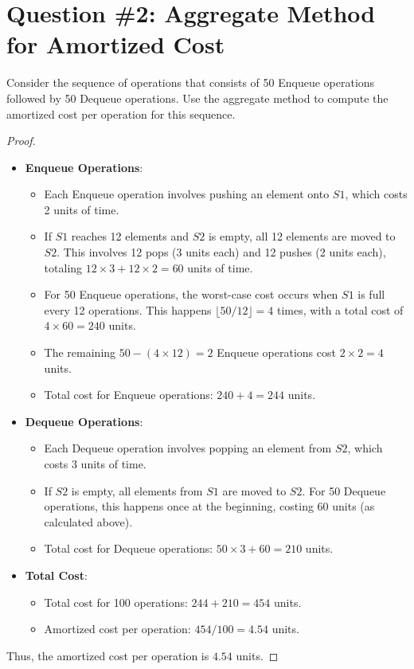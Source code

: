 \documentclass[12pt]{article}
\begin{document}
\section*{Question \#2: Aggregate Method for Amortized Cost}
Consider the sequence of operations that consists of 50 Enqueue operations followed by 50 Dequeue operations. Use the aggregate method to compute the amortized cost per operation for this sequence.

\begin{proof}
\leavevmode\\
\begin{itemize}
    \item \textbf{Enqueue Operations}:
    \begin{itemize}
        \item Each Enqueue operation involves pushing an element onto \( S1 \), which costs 2 units of time.
        \item If \( S1 \) reaches 12 elements and \( S2 \) is empty, all 12 elements are moved to \( S2 \). This involves 12 pops (3 units each) and 12 pushes (2 units each), totaling \( 12 \times 3 + 12 \times 2 = 60 \) units of time.
        \item For 50 Enqueue operations, the worst-case cost occurs when \( S1 \) is full every 12 operations. This happens \( \lfloor 50 / 12 \rfloor = 4 \) times, with a total cost of \( 4 \times 60 = 240 \) units.
        \item The remaining \( 50 - (4 \times 12) = 2 \) Enqueue operations cost \( 2 \times 2 = 4 \) units.
        \item Total cost for Enqueue operations: \( 240 + 4 = 244 \) units.
    \end{itemize}

    \item \textbf{Dequeue Operations}:
    \begin{itemize}
        \item Each Dequeue operation involves popping an element from \( S2 \), which costs 3 units of time.
        \item If \( S2 \) is empty, all elements from \( S1 \) are moved to \( S2 \). For 50 Dequeue operations, this happens once at the beginning, costing 60 units (as calculated above).
        \item Total cost for Dequeue operations: \( 50 \times 3 + 60 = 210 \) units.
    \end{itemize}

    \item \textbf{Total Cost}:
    \begin{itemize}
        \item Total cost for 100 operations: \( 244 + 210 = 454 \) units.
        \item Amortized cost per operation: \( 454 / 100 = 4.54 \) units.
    \end{itemize}
\end{itemize}

Thus, the amortized cost per operation is \( 4.54 \) units.
\end{proof}
\pagebreak
\end{document}
